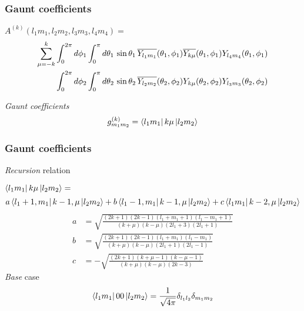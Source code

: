 \begin{frame}[t]
  \frametitle{Gaunt coefficients}
  \footnotesize
  $A^{(k)}(l_1m_1,l_2m_2,l_3m_3,l_4m_4) =$
  \begin{align*}
  \sum_{\mu=-k}^k
  & \int_0^{2\pi}d\phi_1 \int_0^{\pi}d\theta_1\,\sin{\theta_1}\,
    \overline{Y_{l_1m_1}}(\theta_1,\phi_1) \overline{Y_{k\mu}}(\theta_1,\phi_1) Y_{l_4m_4}(\theta_1,\phi_1) \nonumber \\
  & \int_0^{2\pi}d\phi_2 \int_0^{\pi}d\theta_2\,\sin{\theta_2}\,
    \overline{Y_{l_2m_2}}(\theta_2,\phi_2) Y_{k\mu}(\theta_2,\phi_2) Y_{l_3m_3}(\theta_2,\phi_2)
  \end{align*}
  
  \vspace{1em}
  \emph{Gaunt coefficients}
  \[g_{m_1m_2}^{(k)} = \Bra{l_1m_1} k\mu \Ket{l_2m_2}\]
\end{frame}

\begin{frame}[t]
  \frametitle{Gaunt coefficients}
  \scriptsize
  \emph{Recursion} relation
  
  \vspace{1em}
  $\Bra{l_1m_1} k\mu \Ket{l_2m_2} = $
  \vspace{-0.5em}
  \[ a \Bra{l_1+1,m_1} k-1,\mu \Ket{l_2m_2}
  + b \Bra{l_1-1,m_1} k-1,\mu \Ket{l_2m_2}
  + c \Bra{l_1m_1} k-2,\mu \Ket{l_2m_2}
  \]
  \vspace{-2em}
  \begin{align*}
  a & = \sqrt{\frac{(2k+1)(2k-1)(l_1+m_1+1)(l_1-m_1+1)}{(k+\mu)(k-\mu)(2l_1+3)(2l_1+1)}} \\
  b & = \sqrt{\frac{(2k+1)(2k-1)(l_1+m_1)(l_1-m_1)}{(k+\mu)(k-\mu)(2l_1+1)(2l_1-1)}} \\
  c & = -\sqrt{\frac{(2k+1)(k+\mu-1)(k-\mu-1)}{(k+\mu)(k-\mu)(2k-3)}}
  \end{align*}
  \emph{Base} case
  \[\Bra{l_1m_1} 00 \Ket{l_2m_2} = \frac{1}{\sqrt{4\pi}} \delta_{l_1l_2} \delta_{m_1m_2}\]
\end{frame}


